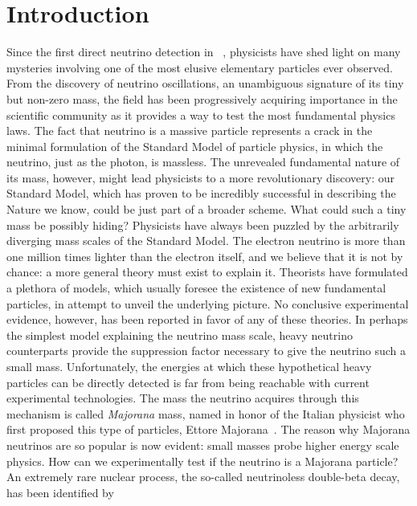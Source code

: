 
\chapter*{Introduction}%
\label{chap:introduction}

Since the first direct neutrino detection in ~\cite{Cowan1956}, physicists have
shed light on many mysteries involving one of the most elusive elementary particles ever
observed. From the discovery of neutrino oscillations, an unambiguous signature of its
tiny but non-zero mass, the field has been progressively acquiring importance in the
scientific community as it provides a way to test the most fundamental physics laws. The
fact that neutrino is a massive particle represents a crack in the minimal formulation of
the Standard Model of particle physics, in which the neutrino, just as the photon, is
massless.  The unrevealed fundamental nature of its mass, however, might lead physicists
to a more revolutionary discovery: our Standard Model, which has proven to be incredibly
successful in describing the Nature we know, could be just part of a broader scheme.
\newpar
What could such a tiny mass be possibly hiding? Physicists have always been puzzled by the
arbitrarily diverging mass scales of the Standard Model. The electron neutrino is more
than one million times lighter than the electron itself, and we believe that it is not by
chance: a more general theory must exist to explain it. Theorists have formulated a
plethora of models, which usually foresee the existence of new fundamental particles, in
attempt to unveil the underlying picture. No conclusive experimental evidence, however,
has been reported in favor of any of these theories. In perhaps the simplest model
explaining the neutrino mass scale, heavy neutrino counterparts provide the suppression
factor necessary to give the neutrino such a small mass. Unfortunately, the energies at
which these hypothetical heavy particles can be directly detected is far from being
reachable with current experimental technologies. The mass the neutrino acquires through
this mechanism is called \emph{Majorana} mass, named in honor of the Italian physicist who
first proposed this type of particles, Ettore Majorana~\cite{Majorana1932}.  The reason
why Majorana neutrinos are so popular is now evident: small masses probe higher energy
scale physics.
\newpar
How can we experimentally test if the neutrino is a Majorana particle? An extremely rare
nuclear process, the so-called neutrinoless double-beta decay, has been identified by
